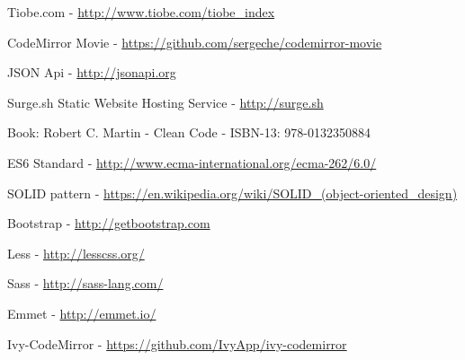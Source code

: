 \documentclass[12pt, a4paper, oneside, openright, medskipamount]{report}
\begin{document}

\backmatter




\begin{thebibliography}{9}

Tiobe.com - \url{http://www.tiobe.com/tiobe_index}

CodeMirror Movie - \url{https://github.com/sergeche/codemirror-movie}

JSON Api - \url{http://jsonapi.org}

Surge.sh Static Website Hosting Service - \url{http://surge.sh}

Book: Robert C. Martin - Clean Code - ISBN-13: 978-0132350884

ES6 Standard - \url{http://www.ecma-international.org/ecma-262/6.0/}

SOLID pattern - \url{https://en.wikipedia.org/wiki/SOLID_(object-oriented_design)}

Bootstrap - \url{http://getbootstrap.com}

Less - \url{http://lesscss.org/}

Sass - \url{http://sass-lang.com/}

Emmet - \url{http://emmet.io/}

Ivy-CodeMirror - \url{https://github.com/IvyApp/ivy-codemirror}

\end{thebibliography}

\end{document}
